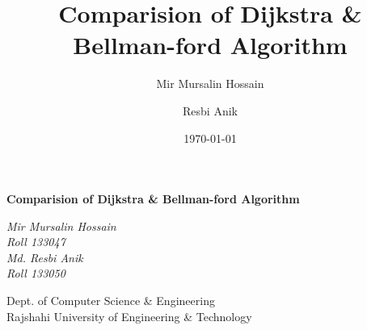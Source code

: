 \documentclass[a4paper,10pt]{article}
\begin{document}
\title {Comparision of Dijkstra & Bellman-ford Algorithm}
\author{Mir Mursalin Hossain}
\author{Resbi Anik}
\date{\today}

\begin{center}
\LARGE\textbf{Comparision of Dijkstra \& Bellman-ford Algorithm}
\vspace{.3cm}
\\
\begin{multicols}{2}
\large\textit{Mir Mursalin Hossain\\Roll 133047}
\\
\large\textit{Md. Resbi Anik\\Roll 133050}
\\
\end{multicols}
\small\textrm{Dept. of Computer Science \& Engineering}
\\
\vspace{.1cm}
\small\textrm{Rajshahi University of Engineering \& Technology}
\\
\vspace{1.5cm}
\end{center}
\end{document}
